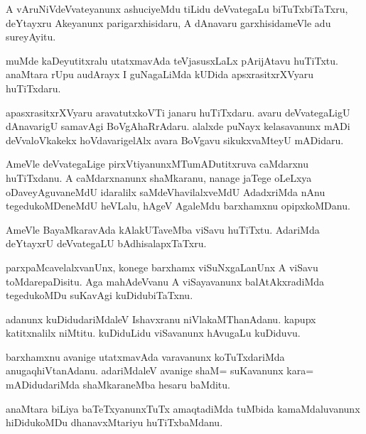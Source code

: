 \documentclass{article}
\begin{document}
\begin{mn}
A vAruNiVdeVvateyanunx ashuciyeMdu tiLidu deVvategaLu biTuTxbiTaTxru,
deYtayxru Akeyanunx parigarxhisidaru, A dAnavaru garxhisidameVle adu sureyAyitu.
\end{mn}

\begin{mn}
muMde kaDeyutitxralu utatxmavAda teVjasusxLaLx pArijAtavu
huTiTxtu. anaMtara rUpu audArayx I guNagaLiMda kUDida
apsxrasitxrXVyaru huTiTxdaru.
\end{mn}

\begin{mn}%
apasxrasitxrXVyaru aravatutxkoVTi janaru huTiTxdaru. avaru
deVvategaLigU dAnavarigU samavAgi BoVgAhaRrAdaru. alalxde puNayx
kelasavanunx mADi deVvaloVkakekx hoVdavarigelAlx avara BoVgavu
sikukxvaMteyU mADidaru.
\end{mn}

\begin{mn}%
AmeVle deVvategaLige pirxVtiyanunxMTumADutitxruva caMdarxnu
huTiTxdanu. A caMdarxnanunx shaMkaranu, nanage jaTege oLeLxya
oDaveyAguvaneMdU idaralilx saMdeVhavilalxveMdU AdadxriMda nAnu
tegedukoMDeneMdU heVLalu, hAgeV AgaleMdu barxhamxnu opipxkoMDanu.
\end{mn}

\begin{mn}
AmeVle BayaMkaravAda kAlakUTaveMba viSavu huTiTxtu. AdariMda deYtayxrU
deVvategaLU bAdhisalapxTaTxru.
\end{mn}

\begin{mn}
parxpaMcavelalxvanUnx, konege barxhamx viSuNxgaLanUnx A viSavu
toMdarepaDisitu. Aga mahAdeVvanu A viSayavanunx balAtAkxradiMda
tegedukoMDu suKavAgi kuDidubiTaTxnu.
\end{mn}

\begin{mn}
adanunx kuDidudariMdaleV Ishavxranu niVlakaMThanAdanu. kapupx
katitxnalilx niMtitu. kuDiduLidu viSavanunx hAvugaLu kuDiduvu.
\end{mn}

\begin{mn}
barxhamxnu avanige utatxmavAda varavanunx koTuTxdariMda
anugaqhiVtanAdanu. adariMdaleV avanige shaM= suKavanunx kara=
mADidudariMda shaMkaraneMba hesaru baMditu.
\end{mn}

\begin{mn}%
anaMtara biLiya baTeTxyanunxTuTx amaqtadiMda tuMbida kamaMdaluvanunx
hiDidukoMDu dhanavxMtariyu huTiTxbaMdanu.
\end{mn}
\end{document}
